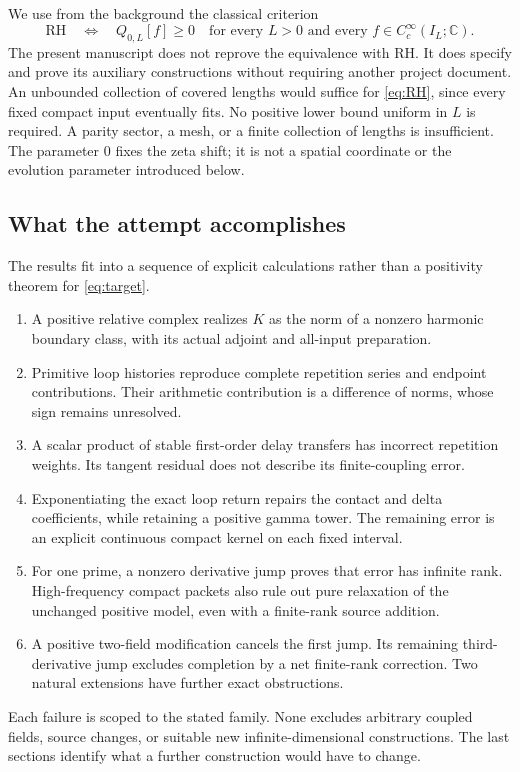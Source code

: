 \documentclass[11pt]{article}
\numberwithin{equation}{section}
\theoremstyle{definition}
\theoremstyle{remark}
\newcommand{\C}{\mathbb C}
\begin{document}
We use from the background the classical criterion
\begin{equation}
 \mathrm{RH}\quad\Longleftrightarrow\quad
 Q_{0,L}[f]\ge0\quad\text{for every }L>0
 \text{ and every }f\in C_c^\infty(I_L;\C).
 \label{eq:RH}
\end{equation}
The present manuscript does not reprove the equivalence with RH. It does specify and prove its auxiliary constructions without requiring another project document. An unbounded collection of covered lengths would suffice for \eqref{eq:RH}, since every fixed compact input eventually fits. No positive lower bound uniform in $L$ is required. A parity sector, a mesh, or a finite collection of lengths is insufficient. The parameter $0$ fixes the zeta shift; it is not a spatial coordinate or the evolution parameter introduced below.

\subsection{What the attempt accomplishes}
The results fit into a sequence of explicit calculations rather than a positivity theorem for \eqref{eq:target}.
\begin{enumerate}
\item A positive relative complex realizes $K$ as the norm of a nonzero harmonic boundary class, with its actual adjoint and all-input preparation.
\item Primitive loop histories reproduce complete repetition series and endpoint contributions. Their arithmetic contribution is a difference of norms, whose sign remains unresolved.
\item A scalar product of stable first-order delay transfers has incorrect repetition weights. Its tangent residual does not describe its finite-coupling error.
\item Exponentiating the exact loop return repairs the contact and delta coefficients, while retaining a positive gamma tower. The remaining error is an explicit continuous compact kernel on each fixed interval.
\item For one prime, a nonzero derivative jump proves that error has infinite rank. High-frequency compact packets also rule out pure relaxation of the unchanged positive model, even with a finite-rank source addition.
\item A positive two-field modification cancels the first jump. Its remaining third-derivative jump excludes completion by a net finite-rank correction. Two natural extensions have further exact obstructions.
\end{enumerate}
Each failure is scoped to the stated family. None excludes arbitrary coupled fields, source changes, or suitable new infinite-dimensional constructions. The last sections identify what a further construction would have to change.
\end{document}
